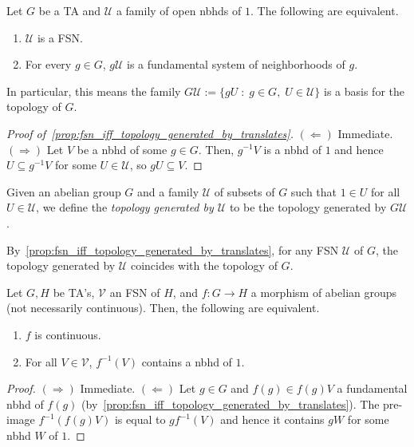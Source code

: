 \begin{proposition}\label{prop:fsn_iff_topology_generated_by_translates} Let $G$ be a TA and $\mathcal{U}$ a family of open nbhds of $1$. The following are equivalent.
\begin{enumerate}
\item[(i)] $\mathcal{U}$ is a FSN.
\item[(ii)] For every $g \in G$, $g\mathcal{U}$ is a fundamental system of neighborhoods of $g$.
\end{enumerate}
\end{proposition}
\begin{remark}  In particular, this means the family $G\mathcal{U} := \{g U \;:\; g \in G, \; U \in \mathcal{U}\}$ is a basis for the topology of $G$.
\end{remark}
\begin{proof}[Proof of~\cref{prop:fsn_iff_topology_generated_by_translates}] $(\Leftarrow)$ Immediate. $(\Rightarrow)$ Let $V$ be a nbhd of some $g \in G$. Then, $g^{-1}V$ is a nbhd of $1$ and hence $U \subseteq g^{-1}V$ for some $U \in \mathcal{U}$, so $gU \subseteq V$.
\end{proof}

\begin{definition} Given an abelian group $G$ and a family $\mathcal{U}$ of subsets of $G$ such that $1 \in U$ for all $U \in \mathcal{U}$, we define the \emph{topology generated by $\mathcal{U}$} to be the topology generated by $G \mathcal{U}$.
\end{definition}

\begin{remark}By~\cref{prop:fsn_iff_topology_generated_by_translates}, for any FSN $\mathcal{U}$ of $G$, the topology generated by $\mathcal{U}$ coincides with the topology of $G$.
\end{remark}

\begin{proposition} Let $G, H$ be TA's, $\mathcal{V}$ an FSN of $H$, and $f : G \rightarrow H$ a morphism of abelian groups (not necessarily continuous). Then, the following are equivalent.
\begin{enumerate}
\item[(i)] $f$ is continuous.
\item[(ii)] For all $V \in \mathcal{V}$, $f^{-1}(V)$ contains a nbhd of $1$.
\end{enumerate}
\end{proposition}
\begin{proof} $(\Rightarrow)$ Immediate. $(\Leftarrow)$ Let $g \in G$ and $f(g) \in f(g)V$ a fundamental nbhd of $f(g)$ (by~\cref{prop:fsn_iff_topology_generated_by_translates}). The pre-image $f^{-1}(f(g) V)$ is equal to $gf^{-1}(V)$ and hence it contains $gW$ for some nbhd $W$ of $1$.
\end{proof}

